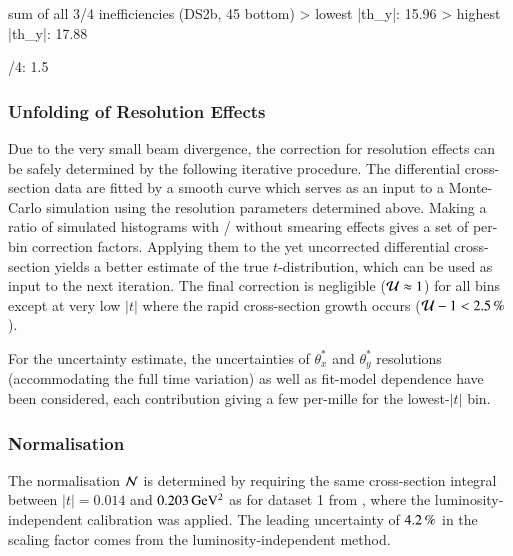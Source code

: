 \> sum of all 3/4 inefficiencies (DS2b, 45 bottom)
\>> lowest |th_y|: 15.96%
\>> highest |th_y|: 17.88%

/4: 1.5%

\fi



\subsubsection{Unfolding of Resolution Effects}
\label{sec:unfolding}

Due to the very small beam divergence, the correction for resolution effects can be safely determined by the following iterative procedure. The differential cross-section data are fitted by a smooth curve which serves as an input to a Monte-Carlo simulation using the resolution parameters determined above. Making a ratio of simulated histograms with / without smearing effects gives a set of per-bin correction factors. Applying them to the yet uncorrected differential cross-section yields a better estimate of the true $t$-distribution, which can be used as input to the next iteration. The final correction is negligible (${\cal U} \approx 1$) for all bins except at very low $|t|$ where the rapid cross-section growth occurs ($ {\cal U} - 1 < 2.5\un{\%}$).

For the uncertainty estimate, the uncertainties of $\theta_x^*$ and $\theta_y^*$ resolutions (accommodating the full time variation) as well as fit-model dependence have been considered, each contribution giving a few per-mille for the lowest-$|t|$ bin.

\subsubsection{Normalisation}
\label{sec:normalisation}

The normalisation ${\cal N}$ is determined by requiring the same cross-section integral between $|t| = 0.014$ and $0.203\,{\rm GeV^2}$ as for dataset 1 from \cite{prl111}, where the luminosity-independent calibration was applied. The leading uncertainty of $4.2\,{\rm \%}$ in the scaling factor comes from the luminosity-independent method.


